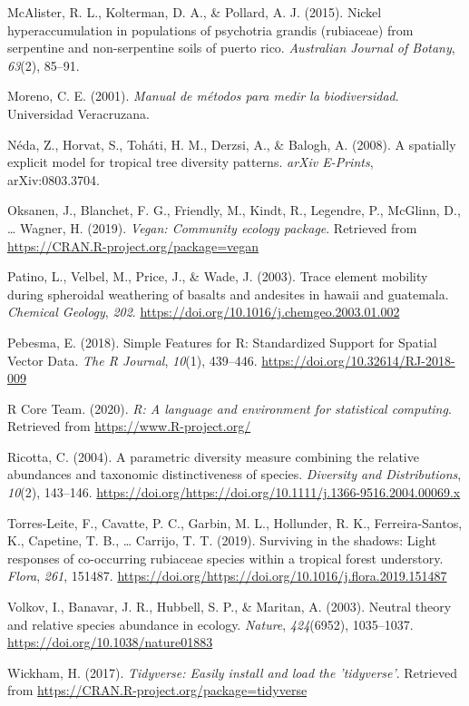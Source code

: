 \documentclass[11pt,]{article}
\begin{document}
\hypertarget{ref-mcalister2015nickel}{}
McAlister, R. L., Kolterman, D. A., \& Pollard, A. J. (2015). Nickel
hyperaccumulation in populations of psychotria grandis (rubiaceae) from
serpentine and non-serpentine soils of puerto rico. \emph{Australian
Journal of Botany}, \emph{63}(2), 85--91.

\hypertarget{ref-moreno2001manual}{}
Moreno, C. E. (2001). \emph{Manual de métodos para medir la
biodiversidad}. Universidad Veracruzana.

\hypertarget{ref-2008arXiv0803.3704N}{}
Néda, Z., Horvat, S., Toháti, H. M., Derzsi, A., \& Balogh, A. (2008). A
spatially explicit model for tropical tree diversity patterns.
\emph{arXiv E-Prints}, arXiv:0803.3704.

\hypertarget{ref-cita_vegan}{}
Oksanen, J., Blanchet, F. G., Friendly, M., Kindt, R., Legendre, P.,
McGlinn, D., \ldots{} Wagner, H. (2019). \emph{Vegan: Community ecology
package}. Retrieved from \url{https://CRAN.R-project.org/package=vegan}

\hypertarget{ref-patino_weathering}{}
Patino, L., Velbel, M., Price, J., \& Wade, J. (2003). Trace element
mobility during spheroidal weathering of basalts and andesites in hawaii
and guatemala. \emph{Chemical Geology}, \emph{202}.
\url{https://doi.org/10.1016/j.chemgeo.2003.01.002}

\hypertarget{ref-cita_sf}{}
Pebesma, E. (2018). Simple Features for R: Standardized Support for
Spatial Vector Data. \emph{The R Journal}, \emph{10}(1), 439--446.
\url{https://doi.org/10.32614/RJ-2018-009}

\hypertarget{ref-cita_r}{}
R Core Team. (2020). \emph{R: A language and environment for statistical
computing}. Retrieved from \url{https://www.R-project.org/}

\hypertarget{ref-https:ux2fux2fdoi.orgux2f10.1111ux2fj.1366-9516.2004.00069.x}{}
Ricotta, C. (2004). A parametric diversity measure combining the
relative abundances and taxonomic distinctiveness of species.
\emph{Diversity and Distributions}, \emph{10}(2), 143--146.
\url{https://doi.org/https://doi.org/10.1111/j.1366-9516.2004.00069.x}

\hypertarget{ref-TORRESLEITE2019151487}{}
Torres-Leite, F., Cavatte, P. C., Garbin, M. L., Hollunder, R. K.,
Ferreira-Santos, K., Capetine, T. B., \ldots{} Carrijo, T. T. (2019).
Surviving in the shadows: Light responses of co-occurring rubiaceae
species within a tropical forest understory. \emph{Flora}, \emph{261},
151487.
\url{https://doi.org/https://doi.org/10.1016/j.flora.2019.151487}

\hypertarget{ref-Volkov_2003}{}
Volkov, I., Banavar, J. R., Hubbell, S. P., \& Maritan, A. (2003).
Neutral theory and relative species abundance in ecology. \emph{Nature},
\emph{424}(6952), 1035--1037. \url{https://doi.org/10.1038/nature01883}

\hypertarget{ref-cita_tidyverse}{}
Wickham, H. (2017). \emph{Tidyverse: Easily install and load the
'tidyverse'}. Retrieved from
\url{https://CRAN.R-project.org/package=tidyverse}




\newpage
\singlespacing 
\end{document}

